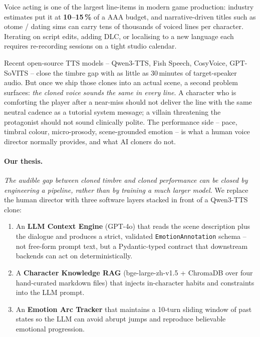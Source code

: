 \documentclass[10pt,a4paper]{article}
\begin{document}
Voice acting is one of the largest line-items in modern game production:
industry estimates put it at \textbf{10--15\,\%} of a AAA budget, and
narrative-driven titles such as otome / dating sims can carry tens of
thousands of voiced lines per character. Iterating on script edits, adding
DLC, or localising to a new language each requires re-recording sessions on
a tight studio calendar.

Recent open-source TTS models -- Qwen3-TTS, Fish Speech, CosyVoice, GPT-SoVITS
-- close the timbre gap with as little as 30\,minutes of target-speaker audio.
But once we ship those clones into an actual scene, a second problem
surfaces: \emph{the cloned voice sounds the same in every line}. A character
who is comforting the player after a near-miss should not deliver the line
with the same neutral cadence as a tutorial system message; a villain
threatening the protagonist should not sound clinically polite. The
performance side -- pace, timbral colour, micro-prosody, scene-grounded
emotion -- is what a human voice director normally provides, and what AI
cloners do not.

\paragraph{Our thesis.} \emph{The audible gap between cloned timbre and
cloned performance can be closed by engineering a pipeline, rather than by
training a much larger model.} We replace the human director with three
software layers stacked in front of a Qwen3-TTS clone:

\begin{enumerate}
  \item An \textbf{LLM Context Engine} (GPT-4o) that reads the scene
        description plus the dialogue and produces a strict, validated
        \texttt{EmotionAnnotation} schema -- not free-form prompt text,
        but a Pydantic-typed contract that downstream backends can act on
        deterministically.
  \item A \textbf{Character Knowledge RAG} (bge-large-zh-v1.5 + ChromaDB
        over four hand-curated markdown files) that injects in-character
        habits and constraints into the LLM prompt.
  \item An \textbf{Emotion Arc Tracker} that maintains a 10-turn sliding
        window of past states so the LLM can avoid abrupt jumps and
        reproduce believable emotional progression.
\end{enumerate}
\end{document}
